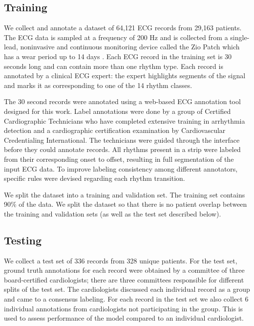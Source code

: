\documentclass{article}
\begin{document}
\subsection*{Training}
We collect and annotate a dataset of 64,121 ECG records from 29,163 patients. The ECG data is sampled at a frequency of 200 Hz and is collected from a single-lead, noninvasive and  continuous monitoring device called the Zio Patch which has a wear period up to 14 days \cite{turakhia2013diagnostic}. Each ECG record in the training set is 30 seconds long and can contain more than one rhythm type. Each record is annotated by a clinical ECG expert: the expert highlights segments of the signal and marks it as corresponding to one of the 14 rhythm classes.

The 30 second records were annotated using a web-based ECG annotation tool designed for this work. Label annotations were done by a group of Certified Cardiographic Technicians who have completed extensive training in arrhythmia detection and a cardiographic certification examination by Cardiovascular Credentialing International. The technicians were guided through the interface before they could annotate records. All rhythms present in a strip were labeled from their corresponding onset to offset, resulting in full segmentation of the input ECG data. To improve labeling consistency among different annotators, specific rules were devised regarding each rhythm transition.

We split the dataset into a training and validation set. The training set contains 90\% of the data. We split the dataset so that there is no patient overlap between the training and validation sets (as well as the test set described below).

\subsection*{Testing}

We collect a test set of 336 records from 328 unique patients. For the test set, ground truth annotations for each record were obtained by a committee of three board-certified cardiologists; there are three committees responsible for different splits of the test set. The cardiologists discussed each individual record as a group and came to a consensus labeling. For each record in the test set we also collect 6 individual annotations from cardiologists not participating in the group. This is used to assess performance of the model compared to an individual cardiologist.
\end{document}
